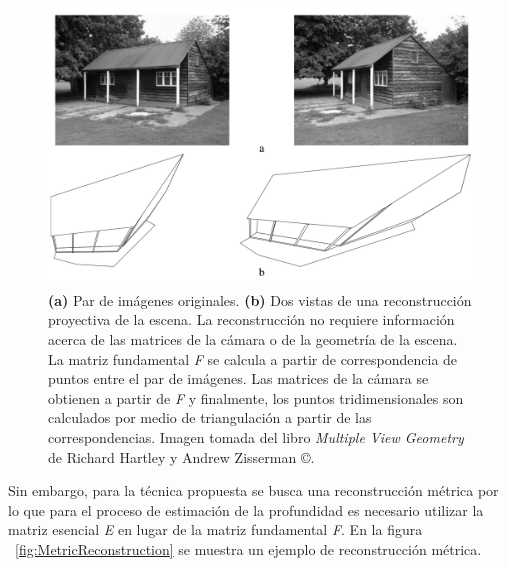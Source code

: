 \begin{figure}[H]
\centering
\includegraphics[width=1.0\textwidth]{images/projectivereconstruction.png}
\caption[Reconstrucci\'{o}n proyectiva]%
{\textbf{(a)} Par de im\'{a}genes originales. \textbf{(b)} Dos vistas de una reconstrucci\'{o}n proyectiva de la escena. La reconstrucci\'{o}n no requiere informaci\'{o}n acerca de las matrices de la c\'{a}mara o de la geometr\'{i}a de la escena. La matriz fundamental \textit{F} se calcula a partir de correspondencia de puntos entre el par de im\'{a}genes. Las matrices de la c\'{a}mara se obtienen a partir de \textit{F} y finalmente, los puntos tridimensionales son calculados por medio de triangulaci\'{o}n a partir de las correspondencias. Imagen tomada del libro \textit{Multiple View Geometry} de Richard Hartley y Andrew Zisserman \copyright.}
\label{fig:ProjectiveReconstruction}
\end{figure}


Sin embargo, para la t\'{e}cnica propuesta se busca una reconstrucci\'{o}n m\'{e}trica por lo que para el proceso de estimaci\'{o}n de la profundidad es necesario utilizar la matriz esencial \textit{E} en lugar de la matriz fundamental \textit{F}. En la figura ~\ref{fig:MetricReconstruction} se muestra un ejemplo de reconstrucci\'{o}n m\'{e}trica.


